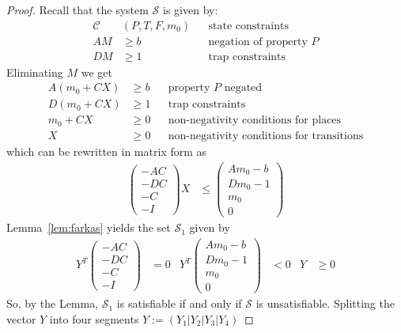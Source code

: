 \begin{proof}
Recall that the system $\mathcal{S}$ is given by:
\begin{align*}
  \mathcal{C}&(P, T, F, m_0)  && \text{state constraints} \\
  A M & \ge b                 && \text{negation of property $P$} \\
  D M & \ge 1                 && \text{trap constraints}
\end{align*}
Eliminating $M$ we get
\begin{align*}
A (m_0 + C X) & \ge b && \text{property $P$ negated} \\
D (m_0 + C X) & \ge 1 && \text{trap constraints} \\
   m_0 + C X  & \ge 0 && \text{non-negativity conditions for places} \\
           X  & \ge 0 && \text{non-negativity conditions for transitions}
\end{align*}
which can be rewritten in matrix form as
%
\begin{align*}
\begin{pmatrix}
  -  A  C \\
  -  D  C \\
  -     C \\
  -     I
\end{pmatrix} X & \le
\begin{pmatrix}
  A m_0 - b \\
  D m_0 - 1 \\
    m_0     \\
     0
\end{pmatrix}
\end{align*}
%
Lemma~\ref{lem:farkas} yields the set $\mathcal{S}_1$ given by  
%
\begin{align*}
  Y^T
\begin{pmatrix}
  -  A  C \\
  -  D  C \\
  -     C \\
  -     I
\end{pmatrix} & = 0  &
  Y^T
\begin{pmatrix}
  A m_0 - b \\
  D m_0 - 1 \\
    m_0     \\
     0
\end{pmatrix} & < 0  &
Y & \ge 0
\end{align*}
So, by the Lemma, $\mathcal{S}_1$ is satisfiable if and only if $\mathcal{S}$ is unsatisfiable. 
Splitting the vector $Y$ into four segments $Y := (Y_1|Y_2|Y_3|Y_4)$ 

\end{proof}

